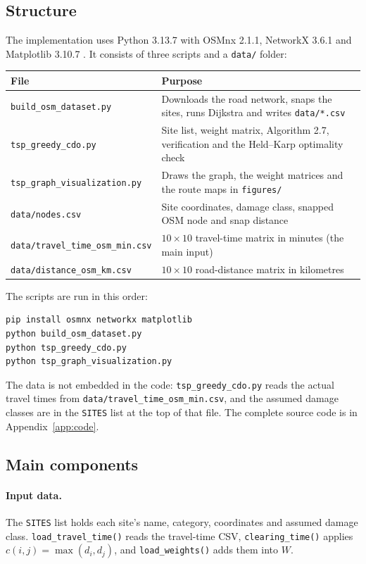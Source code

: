 \documentclass[11pt,a4paper]{article}
\begin{document}
\subsection{Structure}
The implementation uses Python 3.13.7 with OSMnx 2.1.1, NetworkX 3.6.1 \cite{hagberg2008} and Matplotlib 3.10.7 \cite{hunter2007}. It consists of three scripts and a \texttt{data/} folder:
\begin{center}\small
\begin{tabularx}{\textwidth}{lX}
\toprule
File & Purpose \\
\midrule
\texttt{build\_osm\_dataset.py} & Downloads the road network, snaps the sites, runs Dijkstra and writes \texttt{data/*.csv} \\
\texttt{tsp\_greedy\_cdo.py} & Site list, weight matrix, Algorithm 2.7, verification and the Held--Karp optimality check \\
\texttt{tsp\_graph\_visualization.py} & Draws the graph, the weight matrices and the route maps in \texttt{figures/} \\
\texttt{data/nodes.csv} & Site coordinates, damage class, snapped OSM node and snap distance \\
\texttt{data/travel\_time\_osm\_min.csv} & $10 \times 10$ travel-time matrix in minutes (the main input) \\
\texttt{data/distance\_osm\_km.csv} & $10 \times 10$ road-distance matrix in kilometres \\
\bottomrule
\end{tabularx}
\end{center}
The scripts are run in this order:
\begin{lstlisting}[style=out]
pip install osmnx networkx matplotlib
python build_osm_dataset.py
python tsp_greedy_cdo.py
python tsp_graph_visualization.py
\end{lstlisting}
The data is not embedded in the code: \texttt{tsp\_greedy\_cdo.py} reads the actual travel times from \texttt{data/travel\_time\_osm\_min.csv}, and the assumed damage classes are in the \texttt{SITES} list at the top of that file. The complete source code is in Appendix~\ref{app:code}.

\subsection{Main components}
\paragraph{Input data.} The \texttt{SITES} list holds each site's name, category, coordinates and assumed damage class. \texttt{load\_travel\_time()} reads the travel-time CSV, \texttt{clearing\_time()} applies $c(i,j)=\max(d_i,d_j)$, and \texttt{load\_weights()} adds them into $W$.
\end{document}
